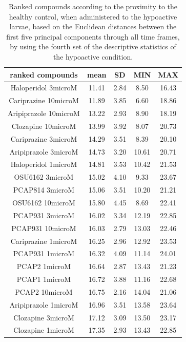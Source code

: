 \begin{table}[h!]\tiny
\centering
\caption{Ranked compounds according to the proximity to the healthy control, when administered to the hypoactive larvae, based on the Euclidean distances between the first five principal components through all time frames, by using the fourth set of the descriptive statistics of the hypoactive condition.}
\begin{tabular}{|c|c|c|c|c|}
\hline
ranked compounds             & mean & SD   & MIN  & MAX   \\ \hline
Haloperidol 3microM   & 11.41 & 2.84  & 8.50   & 16.43 \\ \hline
Cariprazine 10microM  & 11.89 & 3.85  & 6.60   & 18.86 \\ \hline
Aripiprazole 10microM & 13.22 & 2.93  & 8.90   & 18.19 \\ \hline
Clozapine 10microM    & 13.99 & 3.92  & 8.07  & 20.73 \\ \hline
Cariprazine 3microM   & 14.29 & 3.51  & 8.39  & 20.10  \\ \hline
Aripiprazole 3microM  & 14.73 & 3.20   & 10.61 & 20.71 \\ \hline
Haloperidol 1microM   & 14.81 & 3.53  & 10.42 & 21.53 \\ \hline
OSU6162 3microM       & 15.02 & 4.10   & 9.33  & 23.67 \\ \hline
PCAP814 3microM       & 15.06 & 3.51  & 10.20  & 21.21 \\ \hline
OSU6162 10microM      & 15.80  & 4.45  & 8.69  & 22.41 \\ \hline
PCAP931 3microM       & 16.02 & 3.34  & 12.19 & 22.85 \\ \hline
PCAP931 10microM      & 16.03 & 2.79  & 13.03 & 22.46 \\ \hline
Cariprazine 1microM   & 16.25 & 2.96  & 12.92 & 23.53 \\ \hline
PCAP931 1microM       & 16.32 & 4.09  & 11.14 & 24.01 \\ \hline
PCAP2 1microM         & 16.64 & 2.87  & 13.43 & 21.23 \\ \hline
PCAP1 1microM         & 16.72 & 3.88  & 11.16 & 22.68 \\ \hline
PCAP2 10microM        & 16.75 & 2.16  & 14.04 & 21.06 \\ \hline
Aripiprazole 1microM  & 16.96 & 3.51  & 13.58 & 23.64 \\ \hline
Clozapine 3microM     & 17.12 & 3.09  & 13.50  & 23.17 \\ \hline
Clozapine 1microM     & 17.35 & 2.93  & 13.43 & 22.85 \\ \hline

\end{tabular}
\end{table}
